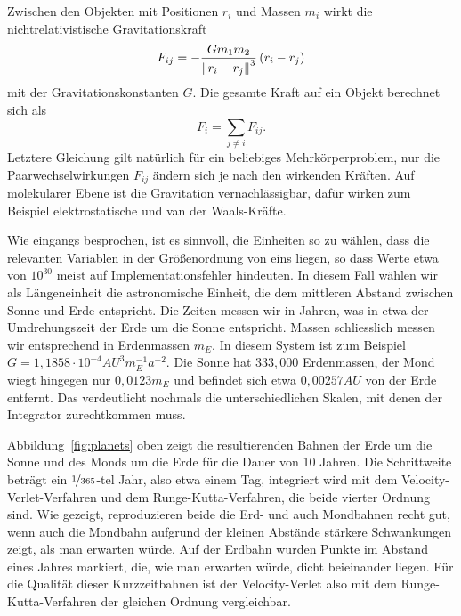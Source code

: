 Zwischen den Objekten mit Positionen $r_i$ und Massen $m_i$ wirkt die
nichtrelativistische Gravitationskraft
\begin{equation}
  F_{ij} = -\frac{G m_1 m_2}{\left\lVert{r_i - r_j}\right\rVert^3}\left(r_i - r_j\right)
\end{equation}
mit der Gravitationskonstanten $G$. Die gesamte Kraft auf ein Objekt
berechnet sich als
\begin{equation}
  F_{i} = \sum_{j\neq i} F_{ij}.
\end{equation}
Letztere Gleichung gilt natürlich für ein beliebiges
Mehrkörperproblem, nur die Paarwechselwirkungen $F_{ij}$ ändern sich
je nach den wirkenden Kräften. Auf molekularer Ebene ist die
Gravitation vernachlässigbar, dafür wirken zum Beispiel
elektrostatische und van der Waals-Kräfte.

Wie eingangs besprochen, ist es sinnvoll, die Einheiten so zu wählen,
dass die relevanten Variablen in der Größenordnung von eins liegen, so
dass Werte etwa von $10^{30}$ meist auf Implementationsfehler
hindeuten. In diesem Fall wählen wir als Längeneinheit die
astronomische Einheit, die dem mittleren Abstand zwischen Sonne und
Erde entspricht. Die Zeiten messen wir in Jahren, was in etwa der
Umdrehungszeit der Erde um die Sonne entspricht. Massen schliesslich
messen wir entsprechend in Erdenmassen $m_E$. In diesem System ist zum
Beispiel $G=1,1858\cdot 10^{-4} AU^3 m_E^{-1} a^{-2}$. Die Sonne hat
$333,000$ Erdenmassen, der Mond wiegt hingegen nur $0,0123m_E$ und
befindet sich etwa $0,00257AU$ von der Erde entfernt. Das verdeutlicht
nochmals die unterschiedlichen Skalen, mit denen der Integrator
zurechtkommen muss.

Abbildung~\ref{fig:planets} oben zeigt die resultierenden Bahnen der
Erde um die Sonne und des Monds um die Erde für die Dauer von 10
Jahren. Die Schrittweite beträgt ein $\nicefrac{1}{365}$-tel Jahr,
also etwa einem Tag, integriert wird mit dem Velocity-Verlet-Verfahren
und dem Runge-Kutta-Verfahren, die beide vierter Ordnung sind. Wie
gezeigt, reproduzieren beide die Erd- und auch Mondbahnen recht gut,
wenn auch die Mondbahn aufgrund der kleinen Abstände stärkere
Schwankungen zeigt, als man erwarten würde. Auf der Erdbahn wurden
Punkte im Abstand eines Jahres markiert, die, wie man erwarten würde,
dicht beieinander liegen. Für die Qualität dieser Kurzzeitbahnen
ist der Velocity-Verlet also mit dem Runge-Kutta-Verfahren der
gleichen Ordnung vergleichbar.

